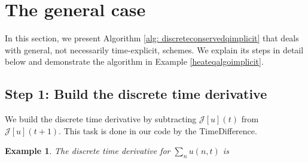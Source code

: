 \documentclass[sigconf,twocolumn]{acmart}
\newcommand{\1}{{\chi}}
\numberwithin{equation}{section}
\theoremstyle{thmlemcorr}
\numberwithin{theorem}{section}
\theoremstyle{thmlemcorr*}
\theoremstyle{defi}
\theoremstyle{remexample}
\newtheorem{example}[theorem]{Example}
\theoremstyle{ass}
\begin{document}
\section{The general case}
In this section, we present Algorithm \ref{alg: discreteconservedqimplicit} that deals with general, not necessarily time-explicit, schemes. We explain its steps in detail below and demonstrate the algorithm in Example \ref{heateqalgoimplicit}.

\subsection*{Step 1: Build the discrete time derivative}
We build the discrete time derivative by subtracting $\mathcal{J}[u](t)$ from $\mathcal{J}[u](t+1)$. This task is done in our code by the {\sc TimeDifference}.
	\begin{example}
		The discrete time derivative for $\sum_n u(n,t)$ is
		
		
		\begin{small}
			
			
		\end{small}
	\end{example}
\end{document}
